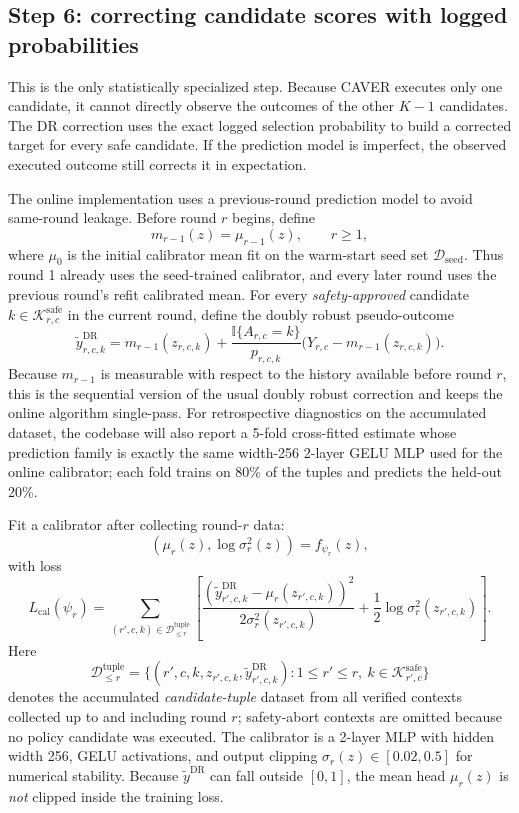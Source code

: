 \documentclass[10pt]{article}
\theoremstyle{plain}
\theoremstyle{definition}
\theoremstyle{remark}
\newcommand{\I}{\mathbb{I}}
\begin{document}
\subsection{Step 6: correcting candidate scores with logged probabilities}

This is the only statistically specialized step. Because CAVER executes only one candidate, it cannot directly observe the outcomes of the other $K-1$ candidates. The DR correction uses the exact logged selection probability to build a corrected target for every safe candidate. If the prediction model is imperfect, the observed executed outcome still corrects it in expectation.

The online implementation uses a previous-round prediction model to avoid same-round leakage. Before round $r$ begins, define
\[
m_{r-1}(z)=\mu_{r-1}(z),\qquad r\ge 1,
\]
where $\mu_0$ is the initial calibrator mean fit on the warm-start seed set $\mathcal D_{\mathrm{seed}}$. Thus round 1 already uses the seed-trained calibrator, and every later round uses the previous round's refit calibrated mean. For every \emph{safety-approved} candidate $k\in\mathcal K^{\mathrm{safe}}_{r,c}$ in the current round, define the doubly robust pseudo-outcome
\[
\tilde y^{\mathrm{DR}}_{r,c,k}=m_{r-1}(z_{r,c,k})+\frac{\I\{A_{r,c}=k\}}{p_{r,c,k}}\big(Y_{r,c}-m_{r-1}(z_{r,c,k})\big).
\]
Because $m_{r-1}$ is measurable with respect to the history available before round $r$, this is the sequential version of the usual doubly robust correction and keeps the online algorithm single-pass. For retrospective diagnostics on the accumulated dataset, the codebase will also report a 5-fold cross-fitted estimate whose prediction family is exactly the same width-256 2-layer GELU MLP used for the online calibrator; each fold trains on 80\% of the tuples and predicts the held-out 20\%.

Fit a calibrator after collecting round-$r$ data:
\[
(\mu_r(z),\log \sigma_r^2(z))=f_{\psi_r}(z),
\]
with loss
\[
L_{\mathrm{cal}}(\psi_r)=\sum_{(r',c,k)\in\mathcal D^{\mathrm{tuple}}_{\le r}}\left[\frac{(\tilde y^{\mathrm{DR}}_{r',c,k}-\mu_r(z_{r',c,k}))^2}{2\sigma_r^2(z_{r',c,k})}+\frac{1}{2}\log\sigma_r^2(z_{r',c,k})\right].
\]
Here
\[
\mathcal D^{\mathrm{tuple}}_{\le r}
=
\big\{(r',c,k,z_{r',c,k},\tilde y^{\mathrm{DR}}_{r',c,k}) : 1\le r'\le r,\ k\in\mathcal K^{\mathrm{safe}}_{r',c}\big\}
\]
denotes the accumulated \emph{candidate-tuple} dataset from all verified contexts collected up to and including round $r$; safety-abort contexts are omitted because no policy candidate was executed. The calibrator is a 2-layer MLP with hidden width 256, GELU activations, and output clipping $\sigma_r(z)\in[0.02,0.5]$ for numerical stability. Because $\tilde y^{\mathrm{DR}}$ can fall outside $[0,1]$, the mean head $\mu_r(z)$ is \emph{not} clipped inside the training loss.
\end{document}

